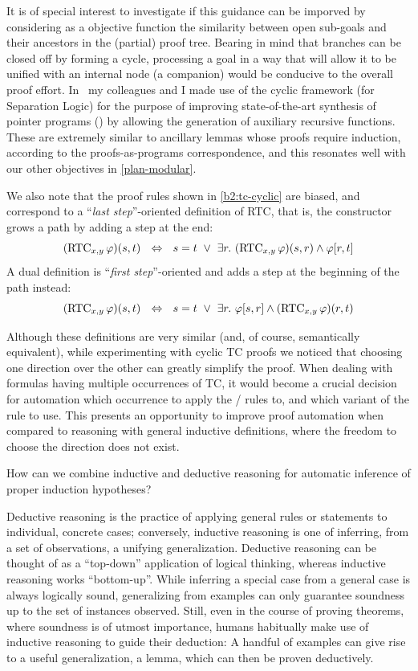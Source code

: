 It is of special interest to investigate if this guidance can be imporved by considering as a objective function the similarity between open sub-goals and their ancestors in the (partial) proof tree.
Bearing in mind that branches can be closed off by forming a cycle, processing a goal in a way that will allow it to be unified with an internal node (a companion) would be conducive to the overall proof effort.
In~\cite{PLDI2021:Itzhaky} my colleagues and I made use of the cyclic framework (for Separation Logic) for the purpose of improving state-of-the-art synthesis of pointer programs (\cite{POPL2019:Polikarpova}) by allowing the generation of auxiliary recursive functions.
These are extremely similar to ancillary lemmas whose proofs require induction, according to the proofs-as-programs correspondence, and this resonates well with our other objectives in \autoref{plan-modular}.

We also note that the proof rules shown in \autoref{b2:tc-cyclic} are biased, and correspond to a ``\emph{last step}''-oriented definition of RTC,
that is, the constructor grows a path by adding a step at the end:
%
\[(\mathrm{RTC}_{x,y}\,\varphi)(s,t) ~~\Leftrightarrow~~
  s = t ~\lor~ \exists r.~(\mathrm{RTC}_{x,y}\,\varphi)(s,r) \land \varphi[r,t]
\]
%
A dual definition is ``\emph{first step}''-oriented and adds a step at the beginning of the path instead:
%
\[(\mathrm{RTC}_{x,y}\,\varphi)(s,t) ~~\Leftrightarrow~~
  s = t ~\lor~ \exists r.~\varphi[s,r] \land (\mathrm{RTC}_{x,y}\,\varphi)(r,t)
\]

Although these definitions are very similar (and, of course, semantically equivalent), while experimenting with cyclic TC proofs we noticed that choosing one direction over the other can greatly simplify the proof.
When dealing with formulas having multiple occurrences of TC, it would become a crucial decision for automation which occurrence to apply the / rules to, and which variant of the rule to use.
This presents an opportunity to improve proof automation when compared to reasoning with general inductive definitions, where the freedom to choose the direction does not exist.

\begin{researchquestion}How can we combine inductive and deductive reasoning for automatic inference of proper induction hypotheses?
\end{researchquestion}

Deductive reasoning is the practice of applying general rules or statements to
individual, concrete cases; conversely, inductive reasoning is one of inferring,
from a set of observations, a unifying generalization.
Deductive reasoning can be thought of as a ``top-down'' application of logical
thinking, whereas inductive reasoning works ``bottom-up''.
While inferring a special case from a general case is always logically sound,
generalizing from examples can only guarantee soundness up to the set of
instances observed.
Still, even in the course of proving theorems, where soundness is of utmost
importance, humans habitually make use of inductive reasoning to guide their
deduction:
A handful of examples can give rise to a useful generalization, a lemma,
which can then be proven deductively.

